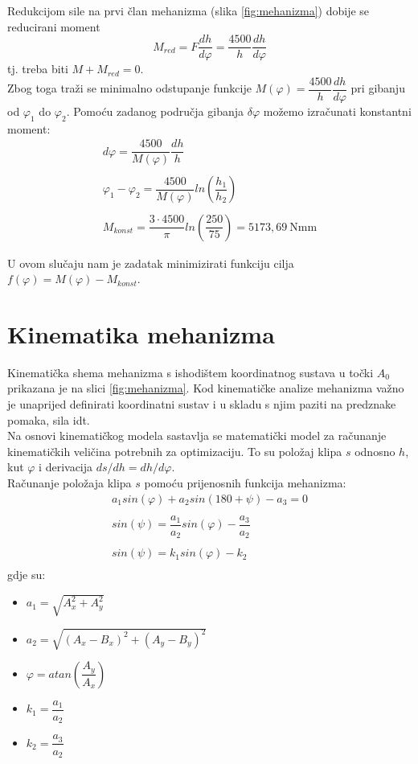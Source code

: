 Redukcijom sile na prvi član mehanizma (slika \ref{fig:mehanizma}) dobije se reducirani moment
\begin{equation}
\label{eq:reducirani}
M_{red}=F\dfrac{dh}{d\varphi }=\dfrac{4500}{h}\dfrac{dh}{d\varphi }
\end{equation}
tj. treba biti $M+M_{red}=0$.\\

Zbog toga traži se minimalno odstupanje funkcije $M(\varphi)=\dfrac{4500}{h}\dfrac{dh}{d\varphi }$ pri gibanju od $\varphi_1$ do $\varphi_2$.
Pomoću zadanog područja gibanja $\delta\varphi$ možemo izračunati konstantni moment:
\begin{gather}
d\varphi=\dfrac{4500}{M(\varphi )}\dfrac{dh}{h}\\
\nonumber\\
\varphi_1 - \varphi_2=\dfrac{4500}{M(\varphi)}ln\left(\dfrac{h_1}{h_2}\right)\\
\nonumber\\
M_{konst}=\dfrac{3\cdot 4500}{\pi}ln\left(\dfrac{250}{75}\right)=5173,69\ \text{Nmm}
\end{gather}

U ovom slučaju nam je zadatak minimizirati funkciju cilja $f(\varphi)=M(\varphi)-M_{konst}$.


\section{Kinematika mehanizma}

\quad Kinematička shema mehanizma s ishodištem koordinatnog sustava u točki $A_0$ prikazana je na slici \ref{fig:mehanizma}. Kod kinematičke analize mehanizma važno je unaprijed definirati koordinatni sustav i u skladu s njim paziti na predznake pomaka, sila idt. \\
Na osnovi kinematičkog modela sastavlja se matematički model za računanje kinematičkih veličina potrebnih za optimizaciju. To su položaj klipa $s$ odnosno $h$, kut $\varphi$ i derivacija $ds/dh=dh/d\varphi$.\\

Računanje položaja klipa $s$ pomoću prijenosnih funkcija mehanizma:
\begin{gather}
a_1sin(\varphi)+a_2sin(180+\psi)-a_3=0\\
\nonumber \\
sin(\psi) = \dfrac{a_1}{a_2}sin(\varphi)-\dfrac{a_3}{a_2}\\
\nonumber \\
sin(\psi) = k_1sin(\varphi)-k_2\\
\end{gather}
gdje su:
\begin{itemize}
\item $a_1=\sqrt{A_x^2+A_y^2}$
\item $a_2=\sqrt{(A_x-B_x)^2+(A_y-B_y)^2} $
\item $\varphi=atan\left( \dfrac{A_y}{A_x}\right) $
\item $k_1=\dfrac{a_1}{a_2}$
\item $k_2=\dfrac{a_3}{a_2}$
\end{itemize}


